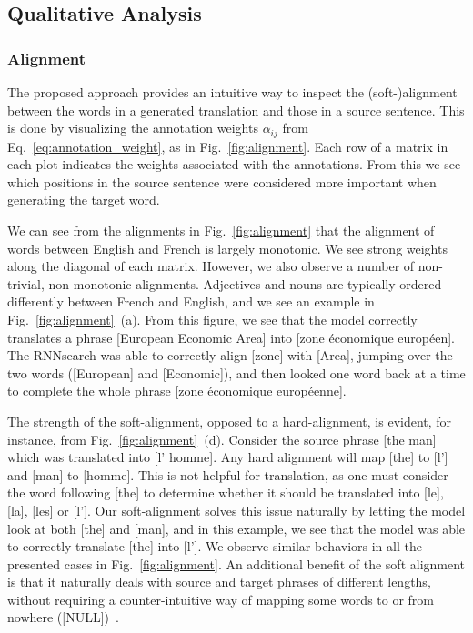 \documentclass{article} %
\begin{document}
\subsection{Qualitative Analysis}

\subsubsection{Alignment}

The proposed approach provides an intuitive way to inspect the
\mbox{(soft-)alignment} between the words in a generated translation and those
in a source sentence.  This is done by visualizing the annotation weights
$\alpha_{ij}$ from Eq.~\eqref{eq:annotation_weight}, as in
Fig.~\ref{fig:alignment}. Each row of a matrix in each plot indicates the
weights associated with the annotations. From this we see which positions in the
source sentence were considered more important when generating the target word. 

We can see from the alignments in Fig.~\ref{fig:alignment} that the alignment of
words between English and French is largely monotonic. We see strong weights
along the diagonal of each matrix. However, we also observe a number of
non-trivial, non-monotonic alignments. Adjectives and nouns are typically
ordered differently between French and English, and we see an example in
Fig.~\ref{fig:alignment}~(a). From this figure, we see that the model correctly
translates a phrase [European Economic Area] into [zone \'economique
europ\'een]. The RNNsearch was able to correctly align [zone] with [Area],
jumping over the two words ([European] and [Economic]), and then looked one word
back at a time to complete the whole phrase [zone \'economique europ\'eenne]. 

The strength of the soft-alignment, opposed to a hard-alignment, is evident, for
instance, from Fig.~\ref{fig:alignment}~(d). Consider the source phrase [the
man] which was translated into [l' homme]. Any hard alignment will map [the] to
[l'] and [man] to [homme]. This is not helpful for translation, as one must
consider the word following [the] to determine whether it should be translated
into [le], [la], [les] or [l'].  Our soft-alignment solves this issue naturally
by letting the model look at both [the] and [man], and in this example, we see
that the model was able to correctly translate [the] into [l']. We observe
similar behaviors in all the presented cases in Fig.~\ref{fig:alignment}. An
additional benefit of the soft alignment is that it naturally deals with source
and target phrases of different lengths, without requiring a counter-intuitive
way of mapping some words to or from nowhere ([NULL])~\citep[see, e.g.,
Chapters~4 and 5 of][]{Koehn2010}.
\end{document}
